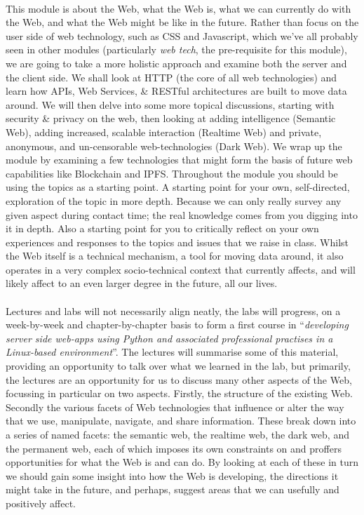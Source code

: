 \documentclass[12pt, a4paper, oneside]{book}
\begin{document}
\paragraph{}This module is about the Web, what the Web is, what we can currently do with the Web, and what the Web might be like in the future. Rather than focus on the user side of web technology, such as CSS and Javascript, which we've all probably seen in other modules (particularly \emph{web tech}, the pre-requisite for this module), we are going to take a more holistic approach and examine both the server and the client side. We shall look at HTTP (the core of all web technologies) and learn how APIs, Web Services, \& RESTful architectures are built to move data around. We will then delve into some more topical discussions, starting with security \& privacy on the web, then looking at adding intelligence (Semantic Web), adding increased, scalable interaction (Realtime Web) and private, anonymous, and un-censorable web-technologies (Dark Web). We wrap up the module by examining a few technologies that might form the basis of future web capabilities like Blockchain and IPFS. Throughout the module you should be using the topics as a starting point. A starting point for your own, self-directed, exploration of the topic in more depth. Because we can only really survey any given aspect during contact time; the real knowledge comes from you digging into it in depth. Also a starting point for you to critically reflect on your own experiences and responses to the topics and issues that we raise in class. Whilst the Web itself is a technical mechanism, a tool for moving data around, it also operates in a very complex socio-technical context that currently affects, and will likely affect to an even larger degree in the future, all our lives.

\paragraph{} Lectures and labs will not necessarily align neatly, the labs will progress, on a week-by-week and chapter-by-chapter basis to form a first course in ``\emph{developing server side web-apps using Python and associated professional practises in a Linux-based environment}''. The lectures will summarise some of this material, providing an opportunity to talk over what we learned in the lab, but primarily, the lectures are an opportunity for us to discuss many other aspects of the Web, focussing in particular on two aspects. Firstly, the structure of the existing Web. Secondly the various facets of Web technologies that influence or alter the way that we use, manipulate, navigate, and share information. These break down into a series of named facets: the semantic web, the realtime web, the dark web, and the permanent web, each of which imposes its own constraints on and proffers opportunities for what the Web is and can do. By looking at each of these in turn we should gain some insight into how the Web is developing, the directions it might take in the future, and perhaps, suggest areas that we can usefully and positively affect.
\end{document}

